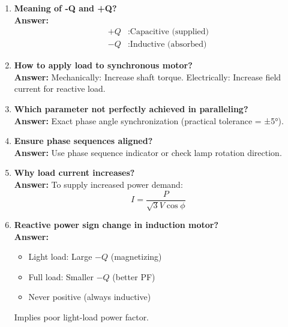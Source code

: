 \documentclass[12pt,a4paper]{article}
\begin{document}
\begin{enumerate}
		\item \textbf{Meaning of -Q and +Q?} \\
		\textbf{Answer:} 
		\begin{align*}
			+Q &: \text{Capacitive (supplied)} \\
			-Q &: \text{Inductive (absorbed)}
		\end{align*}
		
		\item \textbf{How to apply load to synchronous motor?} \\
		\textbf{Answer:} Mechanically: Increase shaft torque. Electrically: Increase field current for reactive load.
		
		\item \textbf{Which parameter not perfectly achieved in paralleling?} \\
		\textbf{Answer:} Exact phase angle synchronization (practical tolerance = ±5°).
		
		\item \textbf{Ensure phase sequences aligned?} \\
		\textbf{Answer:} Use phase sequence indicator or check lamp rotation direction.
		
		\item \textbf{Why load current increases?} \\
		\textbf{Answer:} To supply increased power demand:
		\[
		I = \frac{P}{\sqrt{3}V\cos\phi}
		\]
		
		\item \textbf{Reactive power sign change in induction motor?} \\
		\textbf{Answer:} 
		\begin{itemize}
			\item Light load: Large $-Q$ (magnetizing)
			\item Full load: Smaller $-Q$ (better PF)
			\item Never positive (always inductive)
		\end{itemize}
		Implies poor light-load power factor.
	\end{enumerate}
	
\end{document}
